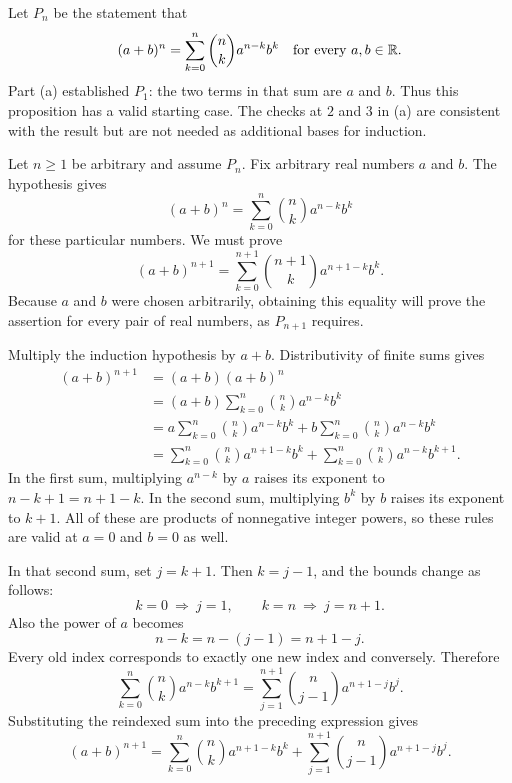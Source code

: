 Let $P_n$ be the statement that
\[
 (a+b)^n=\sum_{k=0}^{n}\binom nk a^{n-k}b^k
 \quad\text{for every }a,b\in\mathbb{R}.
\]
Part (a) established $P_1$: the two terms in that sum are $a$ and $b$.
Thus this proposition has a valid starting case. The checks at $2$ and
$3$ in (a) are consistent with the result but are not needed as additional
bases for induction.

Let $n\geq1$ be arbitrary and assume $P_n$. Fix arbitrary real numbers
$a$ and $b$. The hypothesis gives
\[
 (a+b)^n=\sum_{k=0}^{n}\binom nk a^{n-k}b^k
\]
for these particular numbers. We must prove
\[
 (a+b)^{n+1}
 =\sum_{k=0}^{n+1}\binom{n+1}{k}a^{n+1-k}b^k.
\]
Because $a$ and $b$ were chosen arbitrarily, obtaining this equality
will prove the assertion for every pair of real numbers, as $P_{n+1}$
requires.

Multiply the induction hypothesis by $a+b$. Distributivity of finite
sums gives
\begin{align*}
 (a+b)^{n+1}
 &=(a+b)(a+b)^n\\
 &=(a+b)\sum_{k=0}^{n}\binom nk a^{n-k}b^k\\
 &=a\sum_{k=0}^{n}\binom nk a^{n-k}b^k
   +b\sum_{k=0}^{n}\binom nk a^{n-k}b^k\\
 &=\sum_{k=0}^{n}\binom nk a^{n+1-k}b^k
   +\sum_{k=0}^{n}\binom nk a^{n-k}b^{k+1}.
\end{align*}
In the first sum, multiplying $a^{n-k}$ by $a$ raises its exponent
to $n-k+1=n+1-k$. In the second sum, multiplying $b^k$ by $b$
raises its exponent to $k+1$. All of these are products of nonnegative
integer powers, so these rules are valid at $a=0$ and $b=0$ as well.

In that second sum, set $j=k+1$. Then $k=j-1$, and the bounds change
as follows:
\[
 k=0\ \Longrightarrow\ j=1,
 \qquad
 k=n\ \Longrightarrow\ j=n+1.
\]
Also the power of $a$ becomes
\[
 n-k=n-(j-1)=n+1-j.
\]
Every old index corresponds to exactly one new index and conversely.
Therefore
\[
 \sum_{k=0}^{n}\binom nk a^{n-k}b^{k+1}
 =\sum_{j=1}^{n+1}\binom n{j-1}a^{n+1-j}b^j.
\]
Substituting the reindexed sum into the preceding expression gives
\[
 (a+b)^{n+1}
 =\sum_{k=0}^{n}\binom nk a^{n+1-k}b^k
  +\sum_{j=1}^{n+1}\binom n{j-1}a^{n+1-j}b^j.
\]

